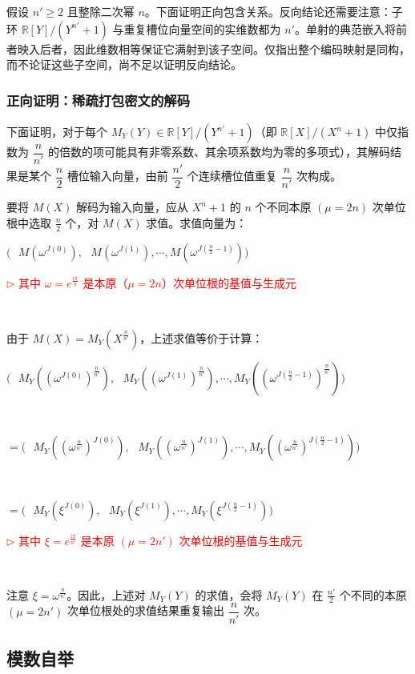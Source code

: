 假设 $n'\geq2$ 且整除二次幂 $n$。下面证明正向包含关系。反向结论还需要注意：子环 $\mathbb{R}[Y]/(Y^{n'}+1)$ 与重复槽位向量空间的实维数都为 $n'$。单射的典范嵌入将前者映入后者，因此维数相等保证它满射到该子空间。仅指出整个编码映射是同构，而不论证这些子空间，尚不足以证明反向结论。

\subsubsection{正向证明：稀疏打包密文的解码}

下面证明，对于每个 $M_Y(Y) \in \mathbb{R}[Y] / (Y^{n'} + 1)$（即 $\mathbb{R}[X] / (X^n + 1)$ 中仅指数为 $\dfrac{n}{n'}$ 的倍数的项可能具有非零系数、其余项系数均为零的多项式），其解码结果是某个 $\dfrac{n}{2}$ 槽位输入向量，由前 $\dfrac{n'}{2}$ 个连续槽位值重复 $\dfrac{n}{n'}$ 次构成。

要将 $M(X)$ 解码为输入向量，应从 $X^n + 1$ 的 $n$ 个不同本原 $(\mu=2n)$ 次单位根中选取 $\frac{n}{2}$ 个，对 $M(X)$ 求值。求值向量为：

$\bm{(} \text{ }
M(\omega^{J(0)}), \text{ } M(\omega^{J(1)}), \cdots,  M(\omega^{J(\frac{n}{2}-1)})\bm{)}$

\textcolor{red}{ $\rhd$ 其中 $\omega=e^{\frac{i\pi}{n}}$ 是本原（$\mu=2n$）次单位根的基值与生成元}

$ $

由于 $M(X) = M_Y(X^{\frac{n}{n'}})$，上述求值等价于计算：

$\bm{(} \text{ }
M_Y((\omega^{J(0)})^{\frac{n}{n'}}), \text{ } M_Y((\omega^{J(1)})^{\frac{n}{n'}}), \cdots,  M_Y((\omega^{J(\frac{n}{2}-1)})^{\frac{n}{n'}}) \bm{)}$

$ $

$= \bm{(} \text{ }
M_Y((\omega^{\frac{n}{n'}})^{J(0)}), \text{ } M_Y((\omega^{\frac{n}{n'}})^{J(1)}), \cdots,  M_Y((\omega^{\frac{n}{n'}})^{J(\frac{n}{2}-1)})\bm{)}$

$ $

$= \bm{(} \text{ }
M_Y(\xi^{J(0)}), \text{ } M_Y(\xi^{J(1)}), \cdots,  M_Y(\xi^{J(\frac{n}{2}-1)})\bm{)}$

\textcolor{red}{ $\rhd$ 其中 $\xi = e^{\frac{i\pi}{n'}}$ 是本原 $(\mu=2n')$ 次单位根的基值与生成元}

$ $

注意 $\xi = \omega^{\frac{n}{n'}}$。因此，上述对 $M_Y(Y)$ 的求值，会将 $M_Y(Y)$ 在 $\frac{n'}{2}$ 个不同的本原 $(\mu=2n')$ 次单位根处的求值结果重复输出 $\dfrac{n}{n'}$ 次。



\subsection{模数自举}
\label{subsec:ckks-bootstrapping}


